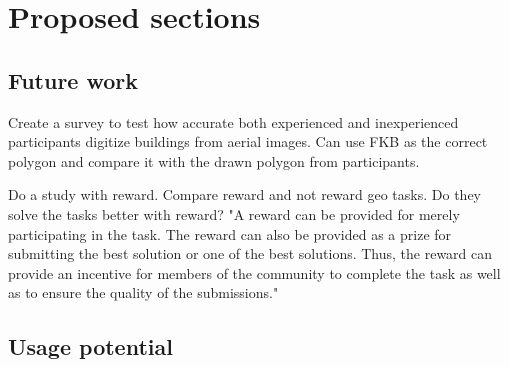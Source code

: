 \chapter{Proposed sections}

\section{Future work}

Create a survey to test how accurate both experienced and inexperienced participants digitize buildings from aerial images. Can use FKB as the correct polygon and compare it with the drawn polygon from participants. 

Do a study with reward. Compare reward and not reward geo tasks. Do they solve the tasks better with reward? "A reward can be provided for merely participating in the task. The reward can also be provided as a prize for submitting the best solution or one of the best solutions. Thus, the reward can provide an incentive for members of the community to complete the task as well as to ensure the quality of the submissions."  %

\section{Usage potential}

